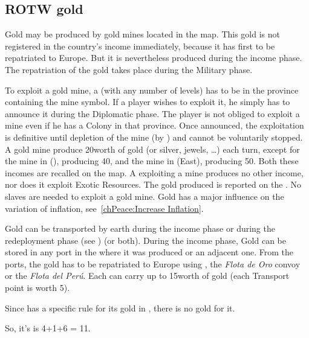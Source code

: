 \subsection{ROTW gold}
\begin{note} Gold may be produced by gold mines located in the \ROTW
  map. This gold is not registered in the country's income immediately,
  because it has first to be repatriated to Europe. But it is
  nevertheless produced during the income phase. The repatriation of the
  gold takes place during the Military phase.
\end{note}
\aparag To exploit a gold mine, a \COL (with any number of levels) has
to be in the province containing the mine symbol. If a player wishes to
exploit it, he simply has to announce it during the Diplomatic phase.
\bparag The player is not obliged to exploit a mine even if he has a
Colony in that province.
\bparag Once announced, the exploitation is definitive until depletion
of the mine (by ) and cannot be voluntarily
stopped.
\bparag A \ROTW gold mine produce 20\ducats worth of gold (or silver,
jewels, \ldots) each turn, except for the mine in \villeTenochtitlan
(\granderegionAzteca), producing 40\ducats, and the mine in
\bazarPotosi (\granderegionInca East), producing 50\ducats. Both
these incomes are recalled on the map.
\bparag\label{chIncomes:Gold Colonies} A \COL exploiting a mine produces no
other income, nor does it exploit Exotic Resources. The gold produced is
reported on the .
\bparag No slaves are needed to exploit a gold mine.
\bparag Gold has a major influence on the variation of inflation,
see~\ref{chPeace:Increase Inflation}.

\aparag \label{chIncomes:Gold Production} Gold can be transported by
earth during the income phase or during the redeployment phase (see
) (or both).
\bparag During the income phase, Gold can be stored in any port \COL in
the \Area where it was produced or an adjacent one.
\bparag From the ports, the gold has to be repatriated to Europe using
\NTD, the \emph{Flota de Oro} convoy or the \emph{Flota del
  Per\'u}. Each \NTD can carry up to 15\ducats worth of gold (each
Transport point is worth 5\ducats).

\begin{exemple}
  Since \POR has a specific rule for its gold in \constructionElmina,
  there is no \ROTW gold for it.

  So, it's  is 4+1+6 = 11\ducats.
\end{exemple}

